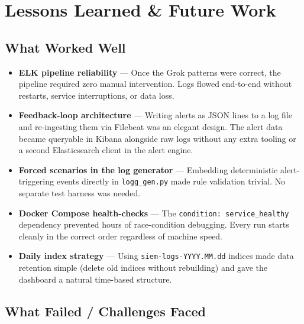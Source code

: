 \documentclass[12pt,a4paper]{article}
\newcommand{\file}[1]{\texttt{\color{accent}#1}}
\begin{document}
\newpage

\section{Lessons Learned \& Future Work}

\subsection{What Worked Well}

\begin{itemize}[leftmargin=2em]
  \item \textbf{ELK pipeline reliability} — Once the Grok patterns were
        correct, the pipeline required zero manual intervention. Logs flowed
        end-to-end without restarts, service interruptions, or data loss.
  \item \textbf{Feedback-loop architecture} — Writing alerts as JSON lines to
        a log file and re-ingesting them via Filebeat was an elegant design.
        The alert data became queryable in Kibana alongside raw logs without
        any extra tooling or a second Elasticsearch client in the alert engine.
  \item \textbf{Forced scenarios in the log generator} — Embedding
        deterministic alert-triggering events directly in \file{logg\_gen.py}
        made rule validation trivial. No separate test harness was needed.
  \item \textbf{Docker Compose health-checks} — The
        \texttt{condition: service\_healthy} dependency prevented hours of
        race-condition debugging. Every run starts cleanly in the correct
        order regardless of machine speed.
  \item \textbf{Daily index strategy} — Using \texttt{siem-logs-YYYY.MM.dd}
        indices made data retention simple (delete old indices without
        rebuilding) and gave the dashboard a natural time-based structure.
\end{itemize}

\subsection{What Failed / Challenges Faced}
\end{document}
